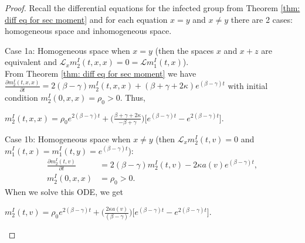 \documentclass[sn-basic]{sn-jnl}%
\theoremstyle{thmstyleone}%
\theoremstyle{thmstyletwo}%
\theoremstyle{thmstylethree}%
\numberwithin{equation}{theorem}
\begin{document}
\begin{proof}
Recall the differential equations for the infected group from Theorem \ref{thm: diff eq for sec moment} and for each equation $x=y$ and $x \neq y$ there are 2 cases: homogeneous space and inhomogeneous space.

Case 1a: Homogeneous space when $x=y$ (then the spaces $x$ and $x+z$ are equivalent and $\mathcal{L}_{x} m_{2}^{I}(t,x,x)=0= \mathcal{L} m_{1}^{I}(t,x)$).\\

From Theorem \ref{thm: diff eq for sec moment} we have $\displaystyle \frac{\partial m_{2}^{I}(t,x,x)}{\partial t} =  2(\beta - \gamma) m_{2}^{I}(t,x,x) + (\beta + \gamma + 2\kappa) e^{\displaystyle (\beta-\gamma)t}$ with initial condition $m_{2}^{I}(0,x,x) = \rho_{0}>0$. Thus,
\begin{center}
$m_{2}^{I}(t,x,x) = \rho_{0} e^{\displaystyle 2 (\beta-\gamma)t} + \Big(\displaystyle \frac{\beta + \gamma + 2\kappa}{-\beta + \gamma}\Big) \Big[ e^{\displaystyle (\beta-\gamma)t} - e^{\displaystyle 2(\beta-\gamma)t} \Big].$
\end{center}

Case 1b: Homogeneous space when $x \neq y$ (then $\mathcal{L}_{x}m_{2}^{I}(t,v) = 0$ and $m_{1}^{I}(t,x)=m_{1}^{I}(t,y)= e^{\displaystyle (\beta-\gamma)t}$):
\begin{align*}
\displaystyle \frac{\partial m_{2}^{I}(t,v)}{\partial t} &= 2(\beta - \gamma) m_{2}^{I}(t,v) - 2 \kappa a(v) e^{\displaystyle (\beta-\gamma)t},\\
m_{2}^{I}(0,x,x) &= \rho_{0}>0.
\end{align*}
When we solve this ODE, we get
\begin{center}
$m_{2}^{I}(t,v) = \rho_{0} e^{\displaystyle 2 (\beta-\gamma)t} + \Big(\displaystyle \frac{2 \kappa a(v)}{(\beta-\gamma)}\Big) \Big[ e^{\displaystyle (\beta-\gamma)t} - e^{\displaystyle 2 (\beta - \gamma)t} \Big]$.
\end{center}


\end{proof}
\end{document}
